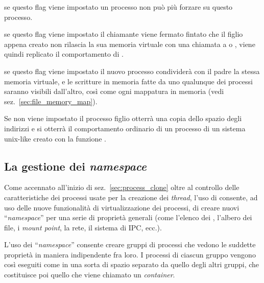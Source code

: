 \begin{basedescript}{\desclabelwidth{1.5 cm}\desclabelstyle{\nextlinelabel}}
\item[\constd{CLONE\_SETTLS}]
\item[\constd{CLONE\_SIGHAND}]
\item[\constd{CLONE\_STOPPED}]
\item[\constd{CLONE\_SYSVSEM}]
\item[\constd{CLONE\_THREAD}]

\item[\constd{CLONE\_UNTRACED}] se questo flag viene impostato un processo non
  può più forzare  su questo processo.

\item[\constd{CLONE\_VFORK}] se questo flag viene impostato il chiamante viene
  fermato fintato che il figlio appena creato non rilascia la sua memoria
  virtuale con una chiamata a  o , viene quindi
  replicato il comportamento di .

\item[\constd{CLONE\_VM}] se questo flag viene impostato il nuovo processo
  condividerà con il padre la stessa memoria virtuale, e le scritture in
  memoria fatte da uno qualunque dei processi saranno visibili dall'altro,
  così come ogni mappatura in memoria (vedi sez.~\ref{sec:file_memory_map}). 

  Se non viene impostato il processo figlio otterrà una copia dello spazio
  degli indirizzi e si otterrà il comportamento ordinario di un processo di un
  sistema unix-like creato con la funzione .
\end{basedescript}



\subsection{La gestione dei \textit{namespace}}
\label{sec:process_namespaces}

Come accennato all'inizio di sez.~\ref{sec:process_clone} oltre al controllo
delle caratteristiche dei processi usate per la creazione dei \textit{thread},
l'uso di  consente, ad uso delle nuove funzionalità di
virtualizzazione dei processi, di creare nuovi ``\textit{namespace}'' per una
serie di proprietà generali (come l'elenco dei , l'albero dei file, i
\textit{mount point}, la rete, il sistema di IPC, ecc.).

L'uso dei ``\textit{namespace}'' consente creare gruppi di processi che vedono
le suddette proprietà in maniera indipendente fra loro. I processi di ciascun
gruppo vengono così eseguiti come in una sorta di spazio separato da quello
degli altri gruppi, che costituisce poi quello che viene chiamato un
\textit{container}.

